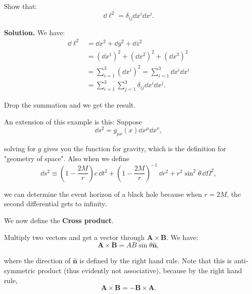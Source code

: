 \documentclass[../main.tex]{subfiles}
\begin{document}
	\begin{example}
		Show that:
		\begin{equation}
		  \dd \ell^{2} = \delta_{ij} \dd x^{i} \dd x^{j}.
		\end{equation}

		\vspace{1\baselineskip}
		\textbf{Solution.} We have:
		\begin{equation}
		  \begin{aligned}
		  \dd \ell^{2} &= \dd x^{2} + \dd y^{2} + \dd z^{2} \\
		  &= (\dd x^{1})^{2} + (\dd x^{2})^{2} + (\dd x^{3})^{2} \\
		  &= \sum_{i=1}^{3} (\dd x^{i})^{2} = \sum_{i=1}^{3} \dd x^{i} \dd x^{i} \\
		  &= \sum_{i=1}^{3} \sum_{j=1}^{3} \delta_{ij} \dd x^{i} \dd x^{j}.
		  \end{aligned}
		\end{equation}

		Drop the summation and we get the result.
	\end{example}

	An extension of this example is this: Suppose
	\begin{equation}
	  \dd s^{2} = g_{\mu \nu} (x) \dd x^{\mu} \dd x^{\nu},
	\end{equation}

	solving for $g$ gives you the function for gravity, which is the definition for "geometry of space". Also when we define
	\begin{equation}
	  \dd s^{2} \equiv \left( 1-\frac{2M}{r} \right) c\,\dd t^{2} + \left( 1-\frac{2M}{r} \right)^{-1}\,\dd r^{2} + r^{2}\sin ^{2}\theta \,\dd\Omega^{2},
	\end{equation}

	we can determine the event horizon of a black hole because when $r=2M$, the second differential gets to infinity.

	\vspace{1\baselineskip}
	We now define the \textbf{Cross product}. 
	\begin{definition}
		Multiply two vectors and get a vector through $\mathbf{A} \times \mathbf{B}$. We have:
		\begin{equation}
		  \mathbf{A} \times \mathbf{B} = AB\sin \theta \hat{\mathbf{n}},
		\end{equation}

		where the direction of $\hat{\mathbf{n}}$ is defined by the right hand rule. Note that this is anti-symmetric product (thus evidently not associative), because by the right hand rule,
		\begin{equation}
		  \mathbf{A} \times \mathbf{B} = -\mathbf{B} \times \mathbf{A}.
		\end{equation}
	\end{definition}
\end{document}
